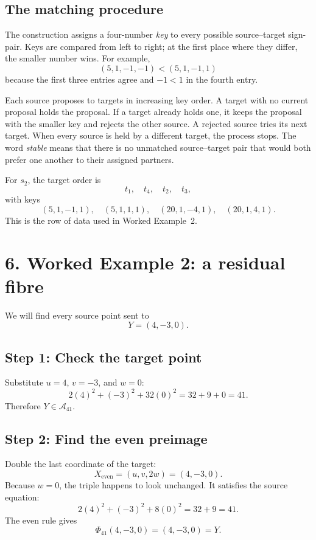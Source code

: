 \documentclass[11pt]{amsart}
\newcommand{\A}{\mathcal A_{41}}
\newcommand{\PhiMap}{\Phi_{41}}
\begin{document}
\subsection*{The matching procedure}

The construction assigns a four-number \emph{key} to every possible
source--target sign-pair.  Keys are compared from left to right; at the first
place where they differ, the smaller number wins.  For example,
\[
 (5,1,-1,-1)<(5,1,-1,1)
\]
because the first three entries agree and \(-1<1\) in the fourth entry.

Each source proposes to targets in increasing key order.  A target with no
current proposal holds the proposal.  If a target already holds one, it keeps
the proposal with the smaller key and rejects the other source.  A rejected
source tries its next target.  When every source is held by a different
target, the process stops.  The word \emph{stable} means that there is no
unmatched source--target pair that would both prefer one another to their
assigned partners.

For \(s_2\), the target order is
\[
 t_1,\quad t_4,\quad t_2,\quad t_3,
\]
with keys
\[
 (5,1,-1,1),\quad (5,1,1,1),\quad
 (20,1,-4,1),\quad (20,1,4,1).
\]
This is the row of data used in Worked Example~2.

\section*{6. Worked Example 2: a residual fibre}

We will find every source point sent to
\[
 Y=(4,-3,0).
\]

\subsection*{Step 1: Check the target point}

Substitute \(u=4\), \(v=-3\), and \(w=0\):
\[
 2(4)^2+(-3)^2+32(0)^2=32+9+0=41.
\]
Therefore \(Y\in\A\).

\subsection*{Step 2: Find the even preimage}

Double the last coordinate of the target:
\[
 X_{\mathrm{even}}=(u,v,2w)=(4,-3,0).
\]
Because \(w=0\), the triple happens to look unchanged.  It satisfies the
source equation:
\[
 2(4)^2+(-3)^2+8(0)^2=32+9=41.
\]
The even rule gives
\[
 \PhiMap(4,-3,0)=(4,-3,0)=Y.
\]
\end{document}
